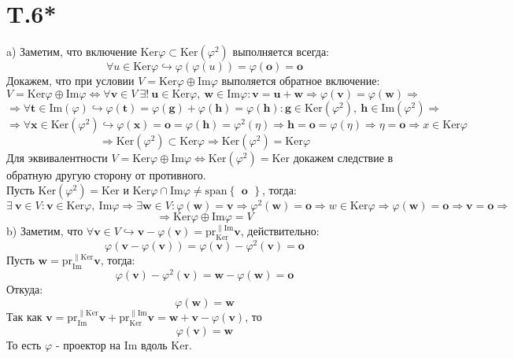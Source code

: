 \section*{T.6*}
a) Заметим, что включение $\mathrm{Ker}\varphi\subset\mathrm{Ker}(\varphi^2)$ выполняется всегда:
$$\forall u\in\mathrm{Ker}\varphi\hookrightarrow\varphi(\varphi(u))=\varphi(\textbf{o})=\textbf{o}$$
Докажем, что при условии $V=\mathrm{Ker}\varphi\oplus\mathrm{Im}\varphi$ выполяется обратное включение:
$$V=\mathrm{Ker}\varphi\oplus\mathrm{Im}\varphi\Leftrightarrow\forall \textbf{v}\in V\ \exists !\ \textbf{u}\in\mathrm{Ker}\varphi,\  \textbf{w}\in\mathrm{Im}\varphi:\textbf{v}=\textbf{u}+\textbf{w}\Rightarrow \varphi(\textbf{v})=\varphi(\textbf{w})\Rightarrow $$
$$\Rightarrow\forall \textbf{t}\in\mathrm{Im}(\varphi)\hookrightarrow\varphi(\textbf{t})=\varphi(\textbf{g})+\varphi(\textbf{h})=\varphi(\textbf{h}):\textbf{g}\in\mathrm{Ker}(\varphi^2),\ \textbf{h}\in\mathrm{Im}(\varphi^2)\Rightarrow$$
$$\Rightarrow\forall \textbf{x}\in\mathrm{Ker}(\varphi^2)\hookrightarrow\varphi(\textbf{x})=\textbf{o}=\varphi(\textbf{h})=\varphi^2(\eta)\Rightarrow \textbf{h}=\textbf{o}=\varphi(\eta)\Rightarrow\eta=\textbf{o}\Rightarrow x\in\mathrm{Ker}\varphi$$
$$\Rightarrow \mathrm{Ker}(\varphi^2)\subset\mathrm{Ker}\varphi\Rightarrow\mathrm{Ker}(\varphi^2)=\mathrm{Ker}\varphi$$
Для эквивалентности $V=\mathrm{Ker}\varphi\oplus\mathrm{Im}\varphi\Leftrightarrow\mathrm{Ker}(\varphi^2)=\mathrm{Ker}$ докажем следствие в обратную другую сторону от противного.\\
Пусть $\mathrm{Ker}(\varphi^2)=\mathrm{Ker}$ и $\mathrm{Ker}\varphi\cap\mathrm{Im}\varphi\neq\mathrm{span}\begin{Bmatrix}
\textbf{o}\end{Bmatrix}$, тогда:
$$\exists\ \textbf{v}\in V:\textbf{v}\in\mathrm{Ker}\varphi,\ \mathrm{Im}\varphi\Rightarrow\exists \textbf{w}\in V:\varphi(\textbf{w})=\textbf{v}\Rightarrow\varphi^2(\textbf{w})=\textbf{o}\Rightarrow w\in\mathrm{Ker}\varphi\Rightarrow\varphi(\textbf{w})=\textbf{o}\Rightarrow \textbf{v}=\textbf{o}\Rightarrow$$
$$\Rightarrow\mathrm{Ker}\varphi\oplus\mathrm{Im}\varphi=V$$
b) Заметим, что $\forall \textbf{v}\in V\hookrightarrow \textbf{v}-\varphi(\textbf{v})=\mathrm{pr}_{\mathrm{Ker}}^{\parallel \mathrm{Im}}\textbf{v}$, действительно:
$$\varphi(\textbf{v}-\varphi(\textbf{v}))=\varphi(\textbf{v})-\varphi^2(\textbf{v})=\textbf{o}$$
Пусть $\textbf{w}=\mathrm{pr}_{\mathrm{Im}}^{\parallel \mathrm{Ker}}\textbf{v}$, тогда:
$$\varphi(\textbf{v})-\varphi^2(\textbf{v})=\textbf{w}-\varphi(\textbf{w})=\textbf{o}$$
Откуда:
$$\varphi(\textbf{w})=\textbf{w}$$
Так как $\textbf{v}=\mathrm{pr}_{\mathrm{Im}}^{\parallel \mathrm{Ker}}\textbf{v}+\mathrm{pr}_{\mathrm{Ker}}^{\parallel \mathrm{Im}}\textbf{v}=\textbf{w}+\textbf{v}-\varphi(\textbf{v})$, то
$$\varphi(\textbf{v})=\textbf{w}$$
То есть $\varphi$ - проектор на $\mathrm{Im}$ вдоль $\mathrm{Ker}$.
